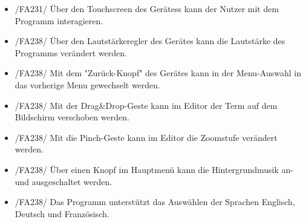 \begin{itemize}
\item /FA231/ Über den Touchscreen des Gerätess kann der Nutzer mit dem Programm interagieren.
\item /FA238/ Über den Lautstärkeregler des Gerätes kann die Lautstärke des Programms verändert werden.
\item /FA238/ Mit dem "Zurück-Knopf" des Gerätes kann in der Menu-Auswahl in das vorherige Menu gewechselt werden.
\item /FA238/ Mit der Drag\&Drop-Geste kann im Editor der Term auf dem Bildschirm verschoben werden.
\item /FA238/ Mit die Pinch-Geste kann im Editor die Zoomstufe verändert werden.
\item /FA238/ Über einen Knopf im Hauptmenü kann die Hintergrundmusik an- und ausgeschaltet werden.
\item /FA238/ Das Programm unterstützt das Auswählen der Sprachen Englisch, Deutsch und Französisch.
\end{itemize}